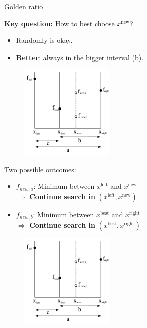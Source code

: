 \begin{vbframe}{Golden ratio}

\textbf{Key question:} How to best choose $x^{\text{new}}$? 

\begin{itemize}
  \item Randomly is okay. 
  \item \textbf{Better}: always in the bigger interval (b). 
\end{itemize}


\begin{figure}
\includegraphics[width=0.4\textwidth]{figure_man/goldensec.png}\\
\end{figure}


\framebreak 

Two possible outcomes: 

\begin{itemize}
  \item $f_{new, a}$: Minimum between $x^{\text{left}}$ and $x^{\text{new}}$ \\
  $\Rightarrow$ \textbf{Continue search in } $(x^{\text{left}}, x^{\text{new}})$
  \item $f_{new, b}$: Minimum between $x^{\text{best}}$ and $x^{\text{right}}$ \\
  $\Rightarrow$ \textbf{Continue search in } $(x^{\text{best}}, x^{\text{right}})$
\end{itemize}

\begin{figure}
\includegraphics[width=0.4\textwidth]{figure_man/goldensec.png}\\
\end{figure}


\end{vbframe}
